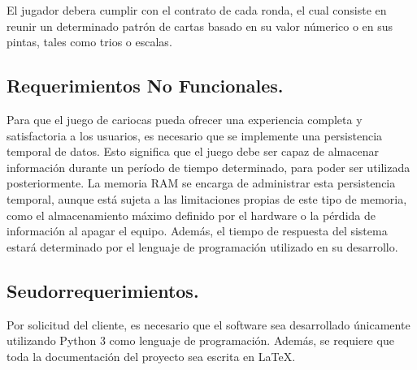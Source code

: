El jugador debera cumplir con el contrato de cada ronda, el cual consiste en reunir un determinado patrón de cartas basado en su valor númerico o en sus pintas, tales como trios o escalas.


\subsection{Requerimientos No Funcionales.}\label{cap:requerimientos-no-funcionales}

Para que el juego de cariocas pueda ofrecer una experiencia completa y satisfactoria a los usuarios, es necesario que se implemente una persistencia temporal de datos. Esto significa que el juego debe ser capaz de almacenar información durante un período de tiempo determinado, para poder ser utilizada posteriormente. La memoria RAM se encarga de administrar esta persistencia temporal, aunque está sujeta a las limitaciones propias de este tipo de memoria, como el almacenamiento máximo definido por el hardware o la pérdida de información al apagar el equipo. Además, el tiempo de respuesta del sistema estará determinado por el lenguaje de programación utilizado en su desarrollo.

\subsection{Seudorrequerimientos.}\label{cap:seudorrequerimientos}
Por solicitud del cliente, es necesario que el software sea desarrollado únicamente utilizando Python 3 como lenguaje de programación. Además, se requiere que toda la documentación del proyecto sea escrita en LaTeX.
